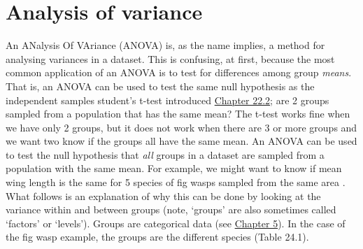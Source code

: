 \documentclass[
  openany]{krantz}
\begin{document}
\begin{verbatim}
\end{verbatim}

\hypertarget{Chapter_24}{%
\chapter{Analysis of variance}\label{Chapter_24}}

An ANalysis Of VAriance (ANOVA) is, as the name implies, a method for analysing variances in a dataset.
This is confusing, at first, because the most common application of an ANOVA is to test for differences among group \emph{means}.
That is, an ANOVA can be used to test the same null hypothesis as the independent samples student's t-test introduced \protect\hyperlink{independent-samples-t-test}{Chapter 22.2}; are 2 groups sampled from a population that has the same mean?
The t-test works fine when we have only 2 groups, but it does not work when there are 3 or more groups and we want two know if the groups all have the same mean.
An ANOVA can be used to test the null hypothesis that \emph{all} groups in a dataset are sampled from a population with the same mean.
For example, we might want to know if mean wing length is the same for 5 species of fig wasps sampled from the same area \citep{Duthie2015b}.
What follows is an explanation of why this can be done by looking at the variance within and between groups (note, `groups' are also sometimes called `factors' or `levels').
Groups are categorical data (see \protect\hyperlink{Chapter_5}{Chapter 5}).
In the case of the fig wasp example, the groups are the different species (Table 24.1).
\end{document}
